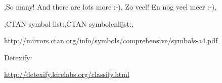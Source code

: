 \copyrightVincent

\begin{frame}
	\begin{center}
		\lang,So many! And there are lots more :-), Zo veel! En nog veel meer :-),
	\end{center}

	\begin{center}
		\lang,CTAN symbol list:,CTAN symbolenlijst:,\par
		\url{http://mirrors.ctan.org/info/symbols/comprehensive/symbols-a4.pdf}
	\end{center}
	
	\begin{center}
		Detexify:\par
		\url{http://detexify.kirelabs.org/classify.html}
	\end{center}
\end{frame}
